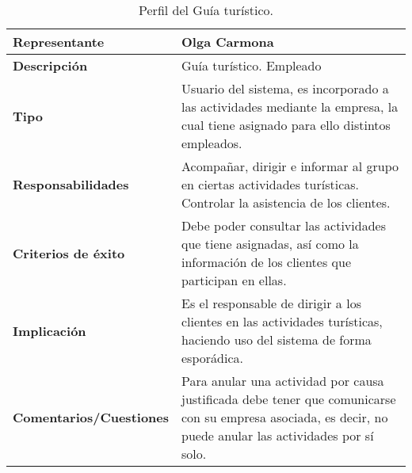 \begin{table}
    \centering
    \begin{tabular}{|p{5cm}|p{10cm}|}
        \hline
        \cellcolor[HTML]{FFCCC9}\textbf{Representante} & Olga Carmona \\ \hline
        \cellcolor[HTML]{FFCCC9}\textbf{Descripción} & Guía turístico. Empleado \\ \hline
        \cellcolor[HTML]{FFCCC9}\textbf{Tipo} & Usuario del sistema, es incorporado a las actividades mediante la empresa, la cual tiene asignado para ello distintos empleados. \\ \hline
        \cellcolor[HTML]{FFCCC9}\textbf{Responsabilidades} & Acompañar, dirigir e informar al grupo en ciertas actividades turísticas. Controlar la asistencia de los clientes.\\ \hline
        \cellcolor[HTML]{FFCCC9}\textbf{Criterios de éxito} & Debe poder consultar las actividades que tiene asignadas, así como la información de los clientes que participan en ellas. \\ \hline
        \cellcolor[HTML]{FFCCC9}\textbf{Implicación} & Es el responsable de dirigir a los clientes en las actividades turísticas, haciendo uso del sistema de forma esporádica. \\ \hline
        \cellcolor[HTML]{FFCCC9}\textbf{Comentarios/Cuestiones} & Para anular una actividad por causa justificada debe tener que comunicarse con su empresa asociada, es decir, no puede anular las actividades por sí solo. \\ \hline
    \end{tabular}
    \caption{Perfil del Guía turístico.}
    \label{tab:per-turistica}
\end{table}

